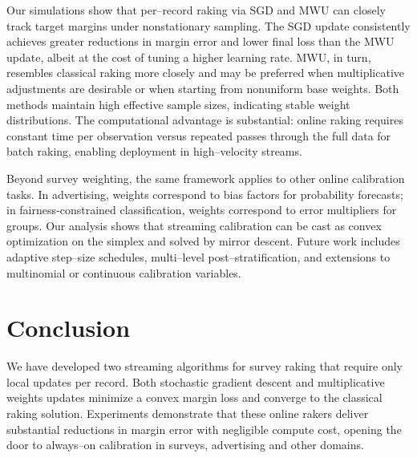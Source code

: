 \documentclass[12pt, letterpaper]{article}
\begin{document}
Our simulations show that per--record raking via SGD and MWU can
closely track target margins under nonstationary sampling.  The SGD
update consistently achieves greater reductions in margin error and
lower final loss than the MWU update, albeit at the cost of tuning a
higher learning rate.  MWU, in turn, resembles classical raking more
closely and may be preferred when multiplicative adjustments are
desirable or when starting from nonuniform base weights.  Both methods
maintain high effective sample sizes, indicating stable weight
distributions.  The computational advantage is substantial: online
raking requires constant time per observation versus repeated passes
through the full data for batch raking, enabling deployment in
high–velocity streams.

Beyond survey weighting, the same framework applies to other online
calibration tasks.  In advertising, weights correspond to bias factors
for probability forecasts; in fairness‐constrained classification,
weights correspond to error multipliers for groups.  Our analysis
shows that streaming calibration can be cast as convex optimization on
the simplex and solved by mirror descent.  Future work includes
adaptive step–size schedules, multi–level post–stratification, and
extensions to multinomial or continuous calibration variables.

\section{Conclusion}

We have developed two streaming algorithms for survey raking that
require only local updates per record.  Both stochastic gradient
descent and multiplicative weights updates minimize a convex margin
loss and converge to the classical raking solution.  Experiments
demonstrate that these online rakers deliver substantial reductions in
margin error with negligible compute cost, opening the door to
always--on calibration in surveys, advertising and other domains.



\end{document}
